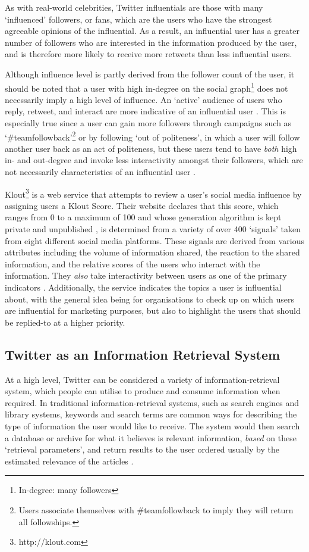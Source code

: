 As with real-world celebrities, Twitter influentials are those with many `influenced' followers, or fans, which are the users who have the strongest agreeable opinions of the influential. As a result, an influential user has a greater number of followers who are interested in the information produced by the user, and is therefore more likely to receive more retweets than less influential users.

Although influence level is partly derived from the follower count of the user, it should be noted that a user with high in-degree on the social graph\footnote{In-degree: many followers} does not necessarily imply a high level of influence. An `active' audience of users who reply, retweet, and interact are more indicative of an influential user \cite{bigonha10}. This is especially true since a user can gain more followers through campaigns such as `\#teamfollowback'\footnote{Users associate themselves with \#teamfollowback to imply they will return all followships.} or by following `out of politeness', in which a user will follow another user back as an act of politeness, but these users tend to have \textit{both} high in- and out-degree and invoke less interactivity amongst their followers, which are not necessarily characteristics of an influential user \cite{cha10}.

Klout\footnote{http://klout.com} is a web service that attempts to review a user's social media influence by assigning users a Klout Score. Their website declares that this score, which ranges from 0 to a maximum of 100 and whose generation algorithm is kept private and unpublished \cite{edwards13}, is determined from a variety of over 400 `signals' taken from eight different social media platforms. These signals are derived from various attributes including the volume of information shared, the reaction to the shared information, and the relative scores of the users who interact with the information. They \textit{also} take interactivity between users as one of the primary indicators \cite{anger11}. Additionally, the service indicates the topics a user is influential about, with the general idea being for organisations to check up on which users are influential for marketing purposes, but also to highlight the users that should be replied-to at a higher priority.


\subsection{Twitter as an Information Retrieval System}
At a high level, Twitter can be considered a variety of information-retrieval system, which people can utilise to produce and consume information when required. In traditional information-retrieval systems, such as search engines and library systems, keywords and search terms are common ways for describing the type of information the user would like to receive. The system would then search a database or archive for what it believes is relevant information, \textit{based} on these `retrieval parameters', and return results to the user ordered usually by the estimated relevance of the articles \cite{arvola10}.

